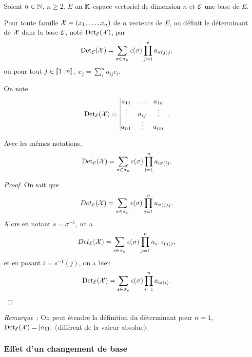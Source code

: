 Soient $n \in \mathbb{N}$, $n\geqslant 2$. $E$ un $\mathbb{K}$-espace vectoriel de dimension $n$ et $\mathcal{E}$ une base de $E$.
\begin{defdef}
  Pour toute famille $\mathcal{X}=(x_1, \ldots, x_n)$ de $n$ vecteurs de $E$, on définit le déterminant de $\mathcal{X}$ dans la base $\mathcal{E}$, noté $\operatorname{Det}_{\mathcal{E}}(\mathcal{X})$, par
  \begin{equation}
    \operatorname{Det}_{\mathcal{E}}(\mathcal{X}) = \sum_{\sigma \in \sigma_n}\epsilon(\sigma) \prod_{j=1}^n a_{\sigma(j)j},
  \end{equation}
  où pour tout $j \in \mathopen{\llbracket}1\mathclose{}\mathpunct{};n\mathclose{\rrbracket}$, $x_j=\sum_{i}^n a_{ij}e_i$.
\end{defdef}
On note 
\begin{equation}
  \operatorname{Det}_{\mathcal{E}}(\mathcal{X}) = \begin{vmatrix} a_{11} & \ldots & a_{1n} \\ \vdots & a_{ij} & \vdots \\ a_{n1} & \vdots & a_{nn}\end{vmatrix}.
\end{equation}
%
\begin{prop}
 Avec les mêmes notations,
 \begin{equation}
    \operatorname{Det}_{\mathcal{E}}(\mathcal{X}) = \sum_{\sigma \in \sigma_n}\epsilon(\sigma) \prod_{i=1}^n a_{i\sigma(i)}.
 \end{equation}
\end{prop}
\begin{proof}
  On sait que
  \begin{equation}
    Det_{\mathcal{E}}(\mathcal{X}) = \sum_{\sigma \in \sigma_n}\epsilon(\sigma) \prod_{j=1}^n a_{\sigma(j)j}.
  \end{equation}
  Alors en notant $s=\sigma^{-1}$, on a
  \begin{equation}
    Det_{\mathcal{E}}(\mathcal{X}) = \sum_{s \in \sigma_n}\epsilon(\sigma) \prod_{j=1}^n a_{s^{-1}(j)j},
  \end{equation}
  et en posant $i=s^{-1}(j)$, on a bien
   \begin{equation}
    \operatorname{Det}_{\mathcal{E}}(\mathcal{X}) = \sum_{s \in \sigma_n}\epsilon(\sigma) \prod_{i=1}^n a_{is(i)}.
  \end{equation}
\end{proof}

\emph{Remarque}~: On peut étendre la définition du déterminant pour $n=1$, $\operatorname{Det}_{\mathcal{E}}(\mathcal{X}) = \left\lvert a_{11}\right\rvert$ (\danger différent de la valeur absolue).

\subsubsection{Effet d'un changement de base}

